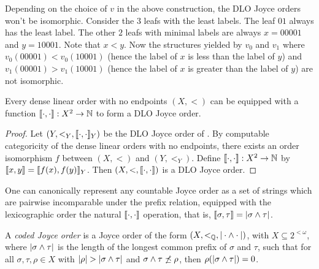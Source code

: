 Depending on the choice of $v$ in the above construction, the DLO Joyce orders won't be isomorphic. Consider the $3$ leafs with the least labels.  The leaf $01$ always has the least label. The other $2$ leafs with minimal labels are always $x=00001$ and $y=10001$. Note that $x < y$. Now the structures yielded by $v_0$ and $v_1$ where $v_0(00001)<v_0(10001)$ (hence the label of $x$ is less than the label of $y$) and $v_1(00001)>v_1(10001)$ (hence the label of $x$ is greater than the label of $y$) are not isomorphic.  




\begin{corollary}[$\RCA_0$]\label{cor:order-can-be-enriched}
Every dense linear order with no endpoints $(X, <)$ can be equipped with a function $\llbracket \cdot , \cdot \rrbracket: X^2\to \mathbb{N}$ to form a DLO Joyce order.
\end{corollary}
\begin{proof}
Let $(Y, <_Y, \llbracket \cdot , \cdot \rrbracket_Y)$ be the DLO Joyce order of . By computable categoricity of the dense linear orders with no endpoints, there
exists an order isomorphism $f$ between $(X, <)$ and $(Y, <_Y)$.
Define $\llbracket \cdot , \cdot \rrbracket: X^2 \to \mathbb{N}$ by $\llbracket x , y \rrbracket = \llbracket f(x) , f(y) \rrbracket_Y$.
Then $(X, <, \llbracket \cdot , \cdot \rrbracket)$ is a DLO Joyce order.
\end{proof}


One can canonically represent any countable Joyce order as a set of strings which are pairwise incomparable under the prefix relation, equipped with the lexicographic order the natural $\llbracket \cdot , \cdot \rrbracket$ operation, that is, $\llbracket \sigma , \tau \rrbracket = |\sigma \wedge \tau|$.

\begin{definition}
A \emph{coded Joyce order} is a Joyce order of the form $(X, <_{\mathbb{Q}}, |\cdot \wedge \cdot|)$,
with $X \subseteq 2^{<\omega}$, where $|\sigma \wedge \tau|$ is the length of the longest common prefix of $\sigma$ and $\tau$, such that for all $\sigma, \tau, \rho \in X$ with $|\rho| > |\sigma \wedge \tau|$ and
$\sigma \wedge \tau \not \preceq \rho$, then $\rho(|\sigma \wedge \tau|) = 0$.

\end{definition}


